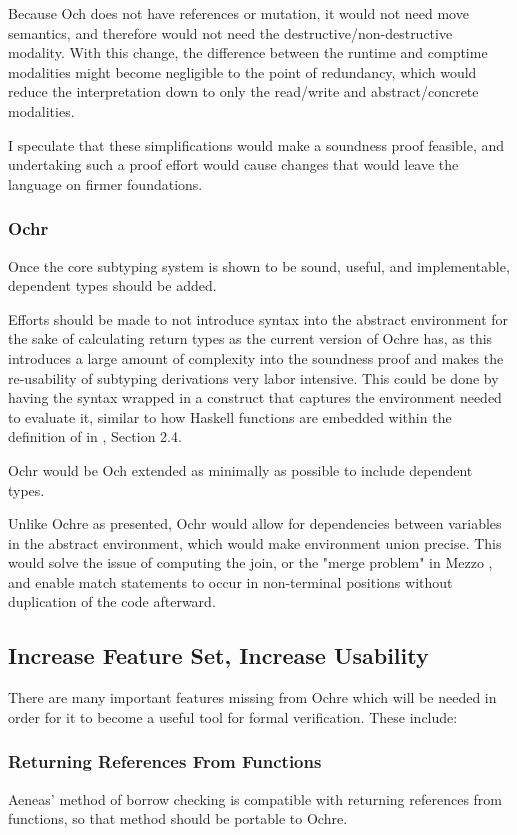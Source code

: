 \documentclass[12pt,twoside]{report}
\begin{document}
Because Och does not have references or mutation, it would not need move semantics, and therefore would not need the destructive/non-destructive modality. With this change, the difference between the runtime and comptime modalities might become negligible to the point of redundancy, which would reduce the interpretation down to only the read/write and abstract/concrete modalities.

I speculate that these simplifications would make a soundness proof feasible, and undertaking such a proof effort would cause changes that would leave the language on firmer foundations.

\subsubsection{Ochr}
Once the core subtyping system is shown to be sound, useful, and implementable, dependent types should be added.

Efforts should be made to not introduce syntax into the abstract environment for the sake of calculating return types as the current version of Ochre has, as this introduces a large amount of complexity into the soundness proof and makes the re-usability of subtyping derivations very labor intensive. This could be done by having the syntax wrapped in a construct that captures the environment needed to evaluate it, similar to how Haskell functions are embedded within the definition of  in \cite{lohTutorialImplementationDependently2010}, Section 2.4.

Ochr would be Och extended as minimally as possible to include dependent types.

Unlike Ochre as presented, Ochr would allow for dependencies between variables in the abstract environment, which would make environment union precise. This would solve the issue of computing the join, or the "merge problem" in Mezzo \citep{protzenkoMezzoTypedLanguage2014}, and enable match statements to occur in non-terminal positions without duplication of the code afterward.

\subsection{Increase Feature Set, Increase Usability}
There are many important features missing from Ochre which will be needed in order for it to become a useful tool for formal verification. These include:

\subsubsection{Returning References From Functions}
Aeneas' method of borrow checking is compatible with returning references from functions, so that method should be portable to Ochre.
\end{document}
